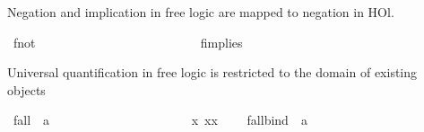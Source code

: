\begin{isabellebody}
\begin{isamarkuptext}%
Negation and implication in free logic are mapped to negation in HOl.%
\end{isamarkuptext}\isamarkuptrue%
\isamarkupfalse%
\ f{\isacharunderscore}not\ {\isacharcolon}{\isacharcolon}\ {\isachardoublequoteopen}{\isasymsigma}{\isasymRightarrow}{\isasymsigma}{\isachardoublequoteclose}\ {\isacharparenleft}{\isachardoublequoteopen}\isactrlbold {\isasymnot}{\isacharunderscore}{\isachardoublequoteclose}\ {\isacharbrackleft}{}{}{\isacharbrackright}\ {}{}{\isacharparenright}\ \ \ \ \ \ \ \ \ \ \isanewline
\ \ {\isachardoublequoteopen}\isactrlbold {\isasymnot}{\isasymphi}\ {\isasymequiv}\ {\isasymnot}{\isasymphi}{\isachardoublequoteclose}\ \ \ \ \ \isanewline
{}\isamarkupfalse%
\ f{\isacharunderscore}implies\ {\isacharcolon}{\isacharcolon}\ {\isachardoublequoteopen}{\isasymsigma}{\isasymRightarrow}{\isasymsigma}{\isasymRightarrow}{\isasymsigma}{\isachardoublequoteclose}\ {\isacharparenleft}\ {\isachardoublequoteopen}\isactrlbold {\isasymrightarrow}{\isachardoublequoteclose}\ {}{}{\isacharparenright}\ \ \ \isanewline
\ \ {\isachardoublequoteopen}{\isasymphi}\isactrlbold {\isasymrightarrow}{\isasympsi}\ {\isasymequiv}\ {\isasymphi}{\isasymlongrightarrow}{\isasympsi}{\isachardoublequoteclose}%
\begin{isamarkuptext}%
Universal quantification in free logic is restricted to the domain of existing objects%
\end{isamarkuptext}\isamarkuptrue%
\isamarkupfalse%
\ f{\isacharunderscore}all\ {\isacharcolon}{\isacharcolon}\ {\isachardoublequoteopen}{\isacharparenleft}{\isacharprime}a{\isasymRightarrow}{\isasymsigma}{\isacharparenright}{\isasymRightarrow}{\isasymsigma}{\isachardoublequoteclose}\ {\isacharparenleft}{\isachardoublequoteopen}\isactrlbold {\isasymforall}{\isachardoublequoteclose}{\isacharparenright}\ \ \ \ \ \ \ \ \ \ \ \ \ \ \ \ \ \isanewline
\ \ {\isachardoublequoteopen}\isactrlbold {\isasymforall}{\isasymPhi}\ {\isasymequiv}\ {\isasymforall}x{\isachardot}\ {\isasymA}{\isacharparenleft}x{\isacharparenright}{\isasymlongrightarrow}{\isasymPhi}{\isacharparenleft}x{\isacharparenright}{\isachardoublequoteclose}\ \ \ \isanewline
{}\isamarkupfalse%
\ f{\isacharunderscore}all{\isacharunderscore}bind\ {\isacharcolon}{\isacharcolon}\ {\isachardoublequoteopen}{\isacharparenleft}{\isacharprime}a{\isasymRightarrow}{\isasymsigma}{\isacharparenright}{\isasymRightarrow}{\isasymsigma}{\isachardoublequoteclose}\ {\isacharparenleft}\ {\isachardoublequoteopen}\isactrlbold {\isasymforall}{\isachardoublequoteclose}\ {\isacharbrackleft}{}{\isacharbrackright}\ {}{\isacharparenright}\ \isanewline

\end{isabellebody}

